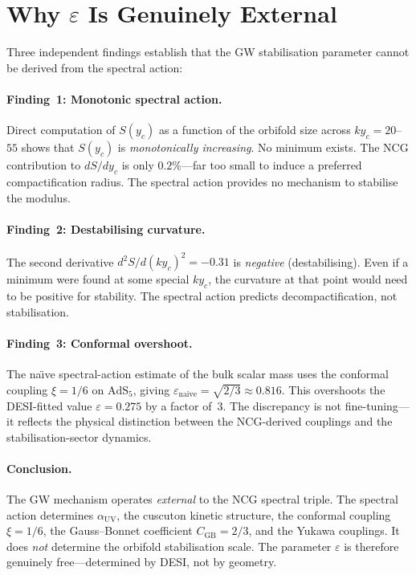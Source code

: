 \section{Why $\varepsilon$ Is Genuinely External}
\label{app:gw-external}

Three independent findings establish that the GW stabilisation parameter cannot be derived from the spectral action:

\paragraph{Finding~1: Monotonic spectral action.}
Direct computation of $S(y_c)$ as a function of the orbifold size across $ky_c = 20$--$55$ shows that $S(y_c)$ is \emph{monotonically increasing}.  No minimum exists.  The NCG contribution to $dS/dy_c$ is only $0.2\%$---far too small to induce a preferred compactification radius.  The spectral action provides no mechanism to stabilise the modulus.

\paragraph{Finding~2: Destabilising curvature.}
The second derivative $d^2 S/d(ky_c)^2 = -0.31$ is \emph{negative} (destabilising).  Even if a minimum were found at some special $ky_c$, the curvature at that point would need to be positive for stability.  The spectral action predicts decompactification, not stabilisation.

\paragraph{Finding~3: Conformal overshoot.}
The na\"{\i}ve spectral-action estimate of the bulk scalar mass uses the conformal coupling $\xi = 1/6$ on $\mathrm{AdS}_5$, giving $\varepsilon_\mathrm{naive} = \sqrt{2/3} \approx 0.816$.  This overshoots the DESI-fitted value $\varepsilon = 0.275$ by a factor of~$3$.  The discrepancy is not fine-tuning---it reflects the physical distinction between the NCG-derived couplings and the stabilisation-sector dynamics.

\paragraph{Conclusion.}
The GW mechanism operates \emph{external} to the NCG spectral triple.  The spectral action determines $\alpha_\mathrm{UV}$, the cuscuton kinetic structure, the conformal coupling $\xi = 1/6$, the Gauss--Bonnet coefficient $C_\mathrm{GB} = 2/3$, and the Yukawa couplings.  It does \emph{not} determine the orbifold stabilisation scale.  The parameter $\varepsilon$ is therefore genuinely free---determined by DESI, not by geometry.

